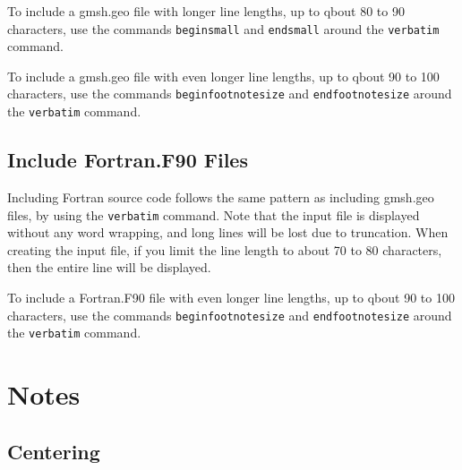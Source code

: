 

To include a gmsh.geo file with longer line lengths, up to qbout 80 to 90 characters, use the commands \texttt{begin{small}} and  \texttt{end{small}} around the \texttt{verbatim} command.

\begin{small}

\end{small}

To include a gmsh.geo file with even longer line lengths, up to qbout 90 to 100 characters, use the commands \texttt{begin{footnotesize}} and  \texttt{end{footnotesize}} around the \texttt{verbatim} command.

\begin{footnotesize}

\end{footnotesize}

\section{Include Fortran.F90 Files}

Including Fortran source code follows the same pattern as including gmsh.geo files, by using the \texttt{verbatim} command.  Note that the input file is displayed without any word wrapping, and long lines will be lost due to truncation.  When creating the input file, if you limit the line length to about 70 to 80 characters, then the entire line will be displayed.



To include a Fortran.F90 file with even longer line lengths, up to qbout 90 to 100 characters, use the commands \texttt{begin{footnotesize}} and  \texttt{end{footnotesize}} around the \texttt{verbatim} command.

\begin{footnotesize}

\end{footnotesize}

\chapter{Notes}

\section{Centering}

